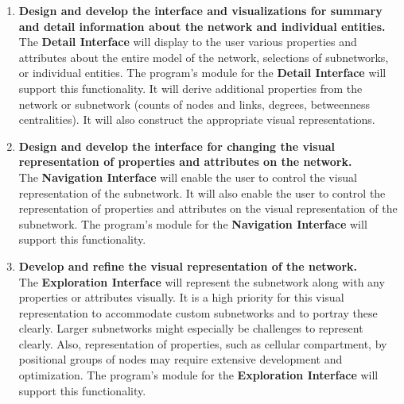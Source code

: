 \begin{enumerate}
\item \textbf{Design and develop the interface and visualizations for summary and detail information about the network and individual entities.}
\\ The \textbf{Detail Interface} will display to the user various properties and attributes about the entire model of the network, selections of subnetworks, or individual entities.
The program's module for the \textbf{Detail Interface} will support this functionality.
It will derive additional properties from the network or subnetwork (counts of nodes and links, degrees, betweenness centralities).
It will also construct the appropriate visual representations.

\item \textbf{Design and develop the interface for changing the visual representation of properties and attributes on the network.}
\\ The \textbf{Navigation Interface} will enable the user to control the visual representation of the subnetwork.
It will also enable the user to control the representation of properties and attributes on the visual representation of the subnetwork.
The program's module for the \textbf{Navigation Interface} will support this functionality.

\item \textbf{Develop and refine the visual representation of the network.}
\\ The \textbf{Exploration Interface} will represent the subnetwork along with any properties or attributes visually.
It is a high priority for this visual representation to accommodate custom subnetworks and to portray these clearly.
Larger subnetworks might especially be challenges to represent clearly.
Also, representation of properties, such as cellular compartment, by positional groups of nodes may require extensive development and optimization.
The program's module for the \textbf{Exploration Interface} will support this functionality.

\end{enumerate}